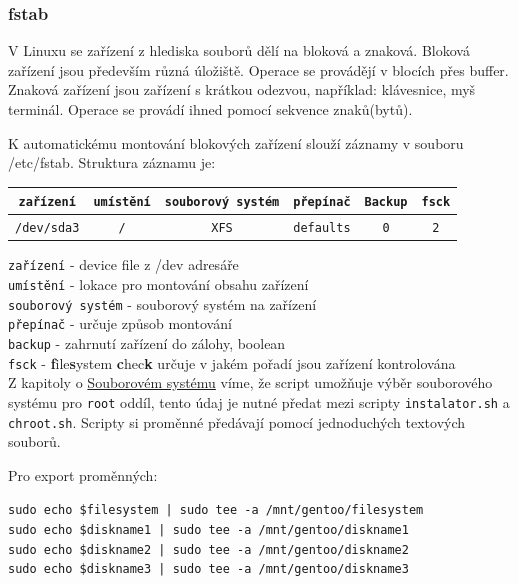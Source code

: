 \documentclass[12pt,a4paper,twoside,]{article}
\begin{document}
\subsubsection{\textsf{fstab}}
V Linuxu se zařízení z hlediska souborů dělí na bloková a znaková. Bloková zařízení jsou především různá úložiště. Operace se provádějí v blocích přes buffer. Znaková zařízení jsou zařízení s krátkou odezvou, například: klávesnice, myš terminál. Operace se provádí ihned pomocí sekvence znaků(bytů).

K automatickému montování blokových zařízení slouží záznamy v souboru /etc/fstab. Struktura záznamu je:

\begin{table}[h]
	\begin{tabular}{|c|c|c|c|c|c|}
		\hline
		\texttt{zařízení} & \texttt{umístění} & \texttt{souborový systém} & \texttt{přepínač} & \texttt{Backup} & \texttt{fsck} \\
		\hline
		\texttt{/dev/sda3} & \texttt{/} & \texttt{XFS} & \texttt{defaults} & \texttt{0} & \texttt{2} \\
		\hline
		
	\end{tabular}
\end{table}
\hspace*{-1.5em}\texttt{zařízení} - device file z /dev adresáře\\
\texttt{umístění} - lokace pro montování obsahu zařízení \\
\texttt{souborový systém} - souborový systém na zařízení\\
\texttt{přepínač} - určuje způsob montování\\
\texttt{backup} - zahrnutí zařízení do zálohy, boolean\\
\texttt{fsck} - {\bf f}ile{\bf s}ystem {\bf c}hec{\bf k} určuje v jakém pořadí jsou zařízení kontrolována\\

Z kapitoly o \hyperlink{Souborový systém}{Souborovém systému} víme, že script umožňuje výběr souborového systému pro \texttt{root} oddíl, tento údaj je nutné předat mezi scripty \texttt{instalator.sh} a \texttt{chroot.sh}. Scripty si proměnné předávají pomocí jednoduchých textových souborů.

\hspace*{-1.5em}Pro export proměnných:

\texttt{sudo echo \$filesystem | sudo tee -a /mnt/gentoo/filesystem} \\
\hspace*{1.5em}\texttt{sudo echo \$diskname1 | sudo tee -a /mnt/gentoo/diskname1} \\
\hspace*{1.5em}\texttt{sudo echo \$diskname2 | sudo tee -a /mnt/gentoo/diskname2} \\
\hspace*{1.5em}\texttt{sudo echo \$diskname3 | sudo tee -a /mnt/gentoo/diskname3} \\
\end{document}
